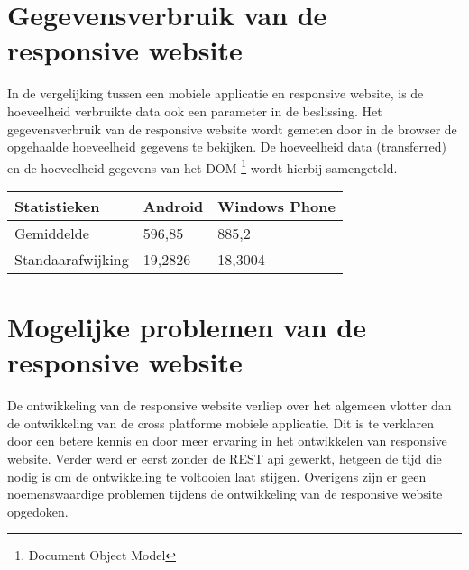 \section{Gegevensverbruik van de responsive website}
In de vergelijking tussen een mobiele applicatie en responsive website, is de hoeveelheid verbruikte data ook een parameter in de beslissing.
Het gegevensverbruik van de responsive website wordt gemeten door in de browser de opgehaalde hoeveelheid gegevens te bekijken.
De hoeveelheid data (transferred) en de hoeveelheid gegevens van het DOM \footnote{Document Object Model} wordt hierbij samengeteld.

\begin{center}
\begin{tabular}{| l | l | l |}
  \hline
  Statistieken & Android & Windows Phone \\ \hline
  Gemiddelde & 596,85 & 885,2 \\ \hline
  Standaarafwijking & 19,2826 & 18,3004 \\ \hline
\end{tabular}
\end{center}
\section{Mogelijke problemen van de responsive website}
De ontwikkeling van de responsive website verliep over het algemeen vlotter dan de ontwikkeling van de cross platforme mobiele applicatie.
Dit is te verklaren door een betere kennis en door meer ervaring in het ontwikkelen van responsive website.
Verder werd er eerst zonder de REST api gewerkt, hetgeen de tijd die nodig is om de ontwikkeling te voltooien laat stijgen.
Overigens zijn er geen noemenswaardige problemen tijdens de ontwikkeling van de responsive website opgedoken.
